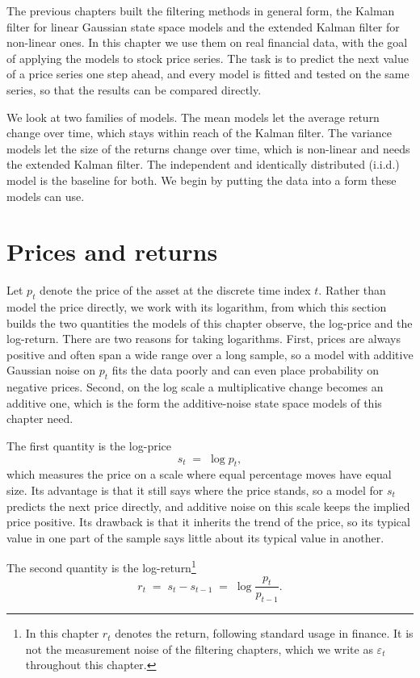 The previous chapters built the filtering methods in general form, the Kalman filter for linear Gaussian state space models and the extended Kalman filter for non-linear ones. In this chapter we use them on real financial data, with the goal of applying the models to stock price series. The task is to predict the next value of a price series one step ahead, and every model is fitted and tested on the same series, so that the results can be compared directly.

We look at two families of models. The mean models let the average return change over time, which stays within reach of the Kalman filter. The variance models let the size of the returns change over time, which is non-linear and needs the extended Kalman filter. The independent and identically distributed (i.i.d.) model is the baseline for both. We begin by putting the data into a form these models can use. 


\section{Prices and returns}\label{sec:prices-returns}
Let $p_t$ denote the price of the asset at the discrete time index $t$. Rather than model the price directly, we work with its logarithm, from which this section builds the two quantities the models of this chapter observe, the log-price and the log-return. There are two reasons for taking logarithms. First, prices are always positive and often span a wide range over a long sample, so a model with additive Gaussian noise on $p_t$ fits the data poorly and can even place probability on negative prices. Second, on the log scale a multiplicative change becomes an additive one, which is the form the additive-noise state space models of this chapter need.

The first quantity is the log-price 
\begin{equation}\label{eq:logprice}
  s_t \;=\; \log p_t ,
\end{equation}
which measures the price on a scale where equal percentage moves have equal size. Its advantage is that it still says where the price stands, so a model for $s_t$ predicts the next price directly, and additive noise on this scale keeps the implied price positive. Its drawback is that it inherits the trend of the price, so its typical value in one part of the sample says little about its typical value in another.

The second quantity is the log-return\footnote{In this chapter $r_t$ denotes the return, following standard usage in finance. It is not the measurement noise of the filtering chapters, which we write as $\varepsilon_t$ throughout this chapter.}
\begin{equation}\label{eq:logreturn}
  r_t \;=\; s_t - s_{t-1} \;=\; \log \frac{p_t}{p_{t-1}} .
\end{equation}

